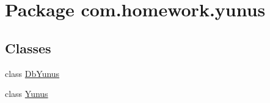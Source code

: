 \hypertarget{namespacecom_1_1homework_1_1yunus}{}\section{Package com.\+homework.\+yunus}
\label{namespacecom_1_1homework_1_1yunus}
\subsection*{Classes}
\begin{DoxyCompactItemize}
\item 
class \hyperlink{classcom_1_1homework_1_1yunus_1_1_db_yunus}{Db\+Yunus}
\item 
class \hyperlink{classcom_1_1homework_1_1yunus_1_1_yunus}{Yunus}
\end{DoxyCompactItemize}

